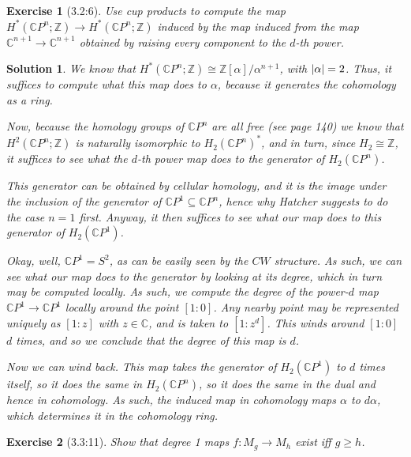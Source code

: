 \documentclass{article}
\theoremstyle{plain}
\newtheorem*{ex}{Exercise}
\theoremstyle{nonumberplain}
\newtheorem{sol}{Solution}
\newcommand{\C}{\mathbb{C}}
\newcommand{\Z}{\mathbb{Z}}
\DeclarePairedDelimiter{\abs}{\lvert}{\rvert}
\begin{document}
\begin{ex}[3.2:6]
Use cup products to compute the map $H^*(\C P^n; \Z) \to H^*(\C P^n; \Z)$ induced by the map induced from the map $\C^{n+1} \to \C^{n+1}$ obtained by raising every component to the $d$-th power.
\end{ex}

\begin{sol}
We know that $H^*(\C P^n; \Z) \cong \Z[\alpha]/\alpha^{n+1}$, with $\abs{\alpha} = 2$. Thus, it suffices to compute what this map does to $\alpha$, because it generates the cohomology as a ring.

Now, because the homology groups of $\C P^n$ are all free (see page 140) we know that $H^2(\C P^n;\Z)$ is naturally isomorphic to $H_2(\C P^n)^*$, and in turn, since $H_2 \cong \Z$, it suffices to see what the $d$-th power map does to the generator of $H_2(\C P^n)$.

This generator can be obtained by cellular homology, and it is the image under the inclusion of the generator of $\C P^1 \subseteq \C P^n$, hence why Hatcher suggests to do the case $n = 1$ first. Anyway, it then suffices to see what our map does to this generator of $H_2(\C P^1)$.

Okay, well, $\C P^1 = S^2$, as can be easily seen by the $CW$ structure. As such, we can see what our map does to the generator by looking at its degree, which in turn may be computed locally. As such, we compute the degree of the power-$d$ map $\C P^1 \to \C P^1$ locally around the point $[1:0]$. Any nearby point may be represented uniquely as $[1:z]$ with $z \in \C$, and is taken to $[1:z^d]$. This winds around $[1:0]$ $d$ times, and so we conclude that the degree of this map is $d$.

Now we can wind back. This map takes the generator of $H_2(\C P^1)$ to $d$ times itself, so it does the same in $H_2(\C P^n)$, so it does the same in the dual and hence in cohomology. As such, the induced map in cohomology maps $\alpha$ to $d \alpha$, which determines it in the cohomology ring.
\end{sol}

\begin{ex}[3.3:11]
Show that degree 1 maps $f \colon M_g \to M_h$ exist iff $g \geq h$.
\end{ex}
\end{document}
